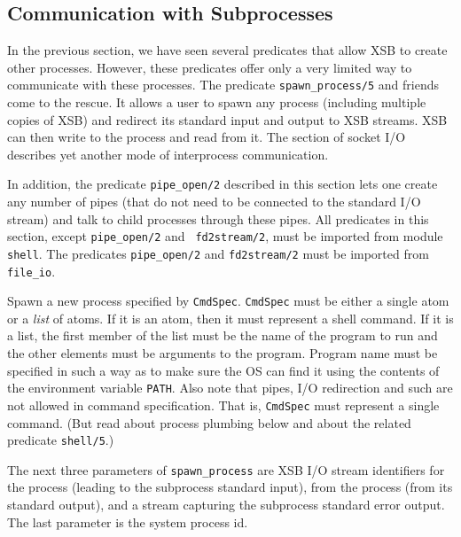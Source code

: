 \subsection{Communication with Subprocesses} \label{sec:subprocesses}

In the previous section, we have seen several predicates that allow XSB to
create other processes. However, these predicates offer only a very limited
way to communicate with these processes. The predicate
\verb|spawn_process/5| and friends come to the rescue. It allows a user to spawn
any process (including multiple copies of XSB) and redirect its
standard input and output to XSB streams. XSB can then write to the
process and read from it. The section of socket I/O describes yet
another mode of interprocess communication.

In addition, the predicate {\tt pipe\_open/2} described in this
section lets one create any number of pipes (that do not need to be
connected to the standard I/O stream) and talk to child processes
through these pipes.
%
All predicates in this section, except {\tt pipe\_open/2} and {\tt
fd2stream/2}, must be imported from module {\tt shell}.  The
predicates {\tt pipe\_open/2} and {\tt fd2stream/2} must be imported
from {\tt file\_io}.

\begin{description}
Spawn a new process specified by {\tt CmdSpec}. {\tt CmdSpec} must be
either a single atom or a \emph{list} of atoms.
If it is an atom, then it must represent a shell command.
If it is a list, the first member of the list must be the name of the
program to run and the 
other elements must be arguments to the program. Program name must be specified
in such a way as to make sure the OS can find it using the contents of the
environment variable {\tt PATH}.
Also note that pipes, I/O redirection and such are not allowed in command
specification. That is, {\tt CmdSpec} must represent a single command.
(But read about process plumbing below and about the related predicate
{\tt shell/5}.)

The next three parameters of \verb|spawn_process| are XSB I/O stream
identifiers for the process (leading to the subprocess standard
input), from the process (from its standard output), and a stream
capturing the subprocess standard error output. The last parameter is
the system process id.
\end{description}

